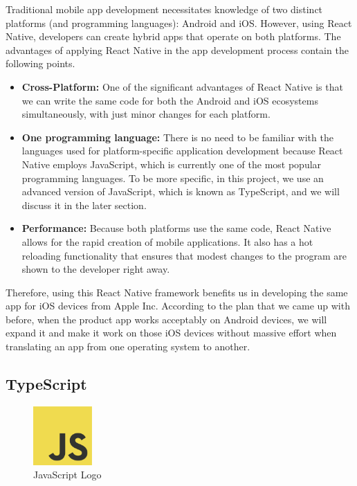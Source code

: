 Traditional mobile app development necessitates knowledge of two distinct platforms (and programming languages): Android and iOS. However, using React Native\cite{ReactNative}, developers can create hybrid apps that operate on both platforms. The advantages of applying React Native in the app development process contain the following points.

\begin{itemize}
	\item \textbf{Cross-Platform:} One of the significant advantages of React Native is that we can write the same code for both the Android and iOS ecosystems simultaneously, with just minor changes for each platform.
	\item \textbf{One programming language:} There is no need to be familiar with the languages used for platform-specific application development because React Native employs JavaScript, which is currently one of the most popular programming languages\cite{10MostPopularProgrammingLang}. To be more specific, in this project, we use an advanced version of JavaScript, which is known as TypeScript\cite{TypeScript}, and we will discuss it in the later section.
	\item \textbf{Performance:} Because both platforms use the same code, React Native allows for the rapid creation of mobile applications. It also has a hot reloading functionality that ensures that modest changes to the program are shown to the developer right away.
\end{itemize}

Therefore, using this React Native framework benefits us in developing the same app for iOS devices from Apple Inc. According to the plan that we came up with before, when the product app works acceptably on Android devices, we will expand it and make it work on those iOS devices without massive effort when translating an app from one operating system to another.

\subsection{TypeScript}

\begin{figure}[H]
	\centering
	\includegraphics[width=0.2\textwidth]{img/technology/JavaScript.png}
	\caption{JavaScript Logo}
	\label{fig:JavaScriptLogo}
\end{figure}

